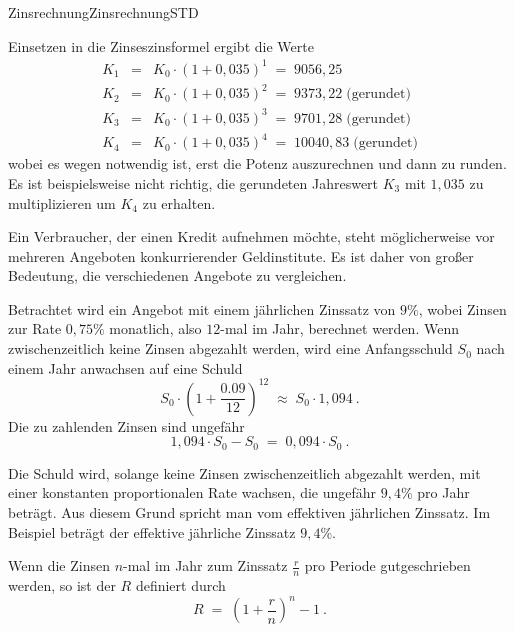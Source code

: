 \begin{MXContent}{Zinsrechnung}{Zinsrechnung}{STD}
\begin{MExercise}
\begin{MHint}{\iSolution}
Einsetzen in die Zinseszinsformel ergibt die Werte
\begin{eqnarray*}
K_1 &=& K_0\cdot \left({1+0,035}\right)^1 \;=\; 9056,25\\
K_2 &=& K_0\cdot \left({1+0,035}\right)^2 \;=\; 9373,22\;\text{(gerundet)}\\
K_3 &=& K_0\cdot \left({1+0,035}\right)^3 \;=\; 9701,28\;\text{(gerundet)}\\
K_4 &=& K_0\cdot \left({1+0,035}\right)^4 \;=\; 10040,83\;\text{(gerundet)}
\end{eqnarray*}
wobei es wegen  notwendig ist, erst die Potenz auszurechnen und dann zu runden. Es ist beispielsweise nicht richtig,
die gerundeten Jahreswert $K_3$ mit $1,035$ zu multiplizieren um $K_4$ zu erhalten.
\end{MHint}
\end{MExercise}

Ein Verbraucher, der einen Kredit aufnehmen möchte, steht möglicherweise vor mehreren Angeboten konkurrierender Geldinstitute.
Es ist daher von großer Bedeutung, die verschiedenen Angebote zu vergleichen.

\begin{MExample}
Betrachtet wird ein Angebot mit einem jährlichen Zinssatz von $9\%$, wobei Zinsen zur Rate $0,75\%$ monatlich, also $12$-mal im Jahr,
berechnet werden. Wenn zwischenzeitlich keine Zinsen abgezahlt werden, wird eine Anfangsschuld $S_{0}$ nach einem Jahr anwachsen auf eine Schuld
$$
S_{0}\cdot \left({1+\frac{0.09}{12} }\right)^{12}\; \approx \; S_{0}\cdot 1,094\: .
$$
Die zu zahlenden Zinsen sind ungefähr
$$
1,094 \cdot S_{0}-S_{0}\; =\; 0,094 \cdot S_{0}\: .
$$
\end{MExample}

Die Schuld wird, solange keine Zinsen zwischenzeitlich abgezahlt werden, mit einer konstanten proportionalen Rate wachsen, die ungefähr $9,4\%$ pro Jahr beträgt.
Aus diesem Grund spricht man vom effektiven jährlichen Zinssatz. Im Beispiel beträgt der effektive jährliche Zinssatz $9,4\%$.

\begin{MInfo}
Wenn die Zinsen $n$-mal im Jahr zum Zinssatz $\frac{r}{n}$ pro Periode gutgeschrieben werden, so ist der  $R$ definiert durch
$$
R\; =\;\left({ 1+\frac{r}{n}}\right)^{n}-1\: .
$$
\end{MInfo}

\end{MXContent}

